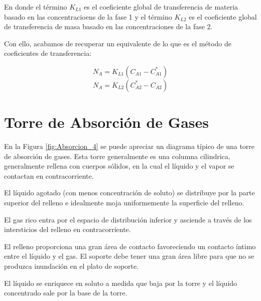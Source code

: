 \documentclass[11pt]{book}
\begin{document}
En donde el término $K_{L1}$ es el coeficiente global de transferencia de materia basado en las concentracioens de la fase 1 y el término $K_{L2}$ es el coeficiente global de transferencia de masa basado en las concentraciones de la fase 2.

Con ello, acabamos de recuperar un equivalente de lo que es el método de coeficientes de transferencia:

\begin{equation}
    \label{eq:Absorcion_26}
    N_A  =  K_{L1} \left( C_{A1} - C_{A1}^* \right)
\end{equation}
\begin{equation}
    \label{eq:Absorcion_27}
     N_A  = K_{L2} \left( C_{A2}^* - C_{A2} \right)
\end{equation}

\section{Torre de Absorción de Gases}

En la Figura \ref{fig:Absorcion_4} se puede apreciar un diagrama típico de una torre de absorción de gases. Esta torre generalmente es una columna cilindrica, generalmente rellena con cuerpos 
sólidos, en la cual el líquido y el vapor se contactan en contracorriente.

El líquido agotado (con menos concentración de soluto) se distribuye por la parte superior del relleno e idealmente moja uniformemente la superficie del relleno.

El gas rico entra por el espacio de distribución  inferior y asciende a través de los intersticios del relleno en contracorriente.

El relleno proporciona una gran área de  contacto favoreciendo un contacto íntimo entre 
el líquido y el gas. El soporte debe tener una gran área libre para  que no se produzca inundación en el plato de  soporte.

El líquido se enriquece en soluto a medida que baja por la torre y el líquido concentrado sale 
por la base de la torre.
\end{document}
